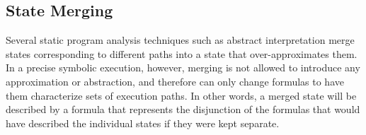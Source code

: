 \subsection{State Merging}

Several static program analysis techniques such as abstract interpretation merge states corresponding to different paths into a state that over-approximates them. In a precise symbolic execution, however, merging is not allowed to introduce any approximation or abstraction, and therefore can only change formulas to have them characterize sets of execution paths. In other words, a merged state will be described by a formula that represents the disjunction of the formulas that would have described the individual states if they were kept separate.

